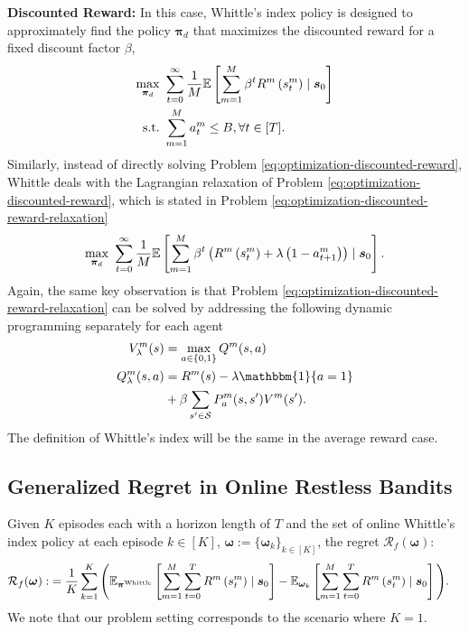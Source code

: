 \textbf{Discounted Reward:} In this case, Whittle's index policy is designed to approximately find the policy $\bm{\pi}_d$ that maximizes the discounted reward for a fixed discount factor $\beta$,
\begin{align}
    \max_{\bm{\pi}_d}~&\sum_{t=0}^{\infty}\frac{1}{M}\mathbb{E}\left[\sum_{m=1}^M\beta^tR^m\left(s_t^m\right)\mid\bm{s}_0
    \right]\notag\\
    \text{s.t.~}&\sum_{m=1}^M a_t^m\leq B,\forall t\in[T]\label{eq:optimization-discounted-reward}.
\end{align}
Similarly, instead of directly solving Problem \ref{eq:optimization-discounted-reward}, Whittle deals with the Lagrangian relaxation of Problem \ref{eq:optimization-discounted-reward}, which is stated in Problem \ref{eq:optimization-discounted-reward-relaxation}
\begin{equation}
    \max_{\bm{\pi}_d}~\sum_{t=0}^{\infty}\frac{1}{M}\mathbb{E}\left[\sum_{m=1}^M\beta^t\left(R^m\left(s_t^m\right)+\lambda\left(1-a_{t+1}^m\right)\right)\mid\bm{s}_0
    \right].\label{eq:optimization-discounted-reward-relaxation}
\end{equation}
Again, the same key observation is that Problem \ref{eq:optimization-discounted-reward-relaxation} can be solved by addressing the following dynamic programming separately for each agent
\begin{align}
    V^m_\lambda(s)&=\max_{a\in\{0,1\}} Q^m(s,a)\notag\\
    Q^m_\lambda(s,a)&=R^m(s)-\lambda\mathbbm{1}\{a=1\}\notag\\&+\beta\sum_{s'\in\mathcal{S}}P^m_a(s,s')V^m(s').\label{eq:dynamic-programming-discounted}
\end{align}
The definition of Whittle's index will be the same in the average reward case.
\subsection{Generalized Regret in Online Restless Bandits}\label{app:generalized_regret}
Given $K$ episodes each with a horizon length of $T$ and the set of online Whittle's index policy at each episode $k\in[K]$, $\bm\omega:=\{\bm \omega_k\}_{k\in[K]}$, the regret $\mathcal{R}_{f}(\bm{\omega})$:
\begin{align}\label{eq:regret-finite-horizon-general}
\mathcal{R}_{f}(\bm{\omega}):&=\frac{1}{K}\sum_{k=1}^K\Bigg(\mathbb{E}_{\bm{\pi}^{\text{Whittle}}}\left[\sum_{m=1}^M\sum_{t=0}^TR^m\left(s_t^m\right)\mid\bm{s}_0
    \right]-\mathbb{E}_{\bm{\omega}_k}\left[\sum_{m=1}^M\sum_{t=0}^TR^m\left(s_t^m\right)\mid\bm{s}_0
    \right]\Bigg).
\end{align}
We note that our problem setting corresponds to the scenario where $K=1$.

